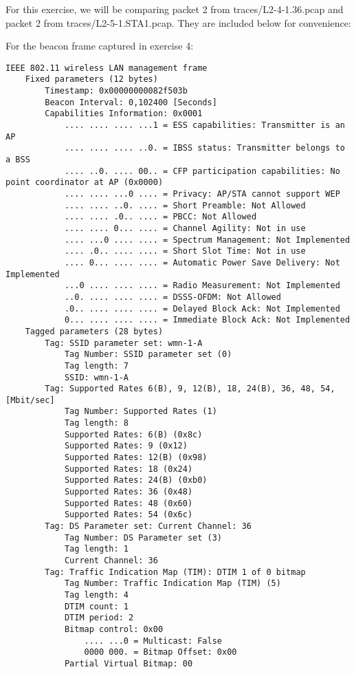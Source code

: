 For this exercise, we will be comparing packet 2 from traces/L2-4-1.36.pcap and packet 2 from traces/L2-5-1.STA1.pcap.
They are included below for convenience:

For the beacon frame captured in  exercise 4:
\begin{lstlisting}
IEEE 802.11 wireless LAN management frame
    Fixed parameters (12 bytes)
        Timestamp: 0x00000000082f503b
        Beacon Interval: 0,102400 [Seconds]
        Capabilities Information: 0x0001
            .... .... .... ...1 = ESS capabilities: Transmitter is an AP
            .... .... .... ..0. = IBSS status: Transmitter belongs to a BSS
            .... ..0. .... 00.. = CFP participation capabilities: No point coordinator at AP (0x0000)
            .... .... ...0 .... = Privacy: AP/STA cannot support WEP
            .... .... ..0. .... = Short Preamble: Not Allowed
            .... .... .0.. .... = PBCC: Not Allowed
            .... .... 0... .... = Channel Agility: Not in use
            .... ...0 .... .... = Spectrum Management: Not Implemented
            .... .0.. .... .... = Short Slot Time: Not in use
            .... 0... .... .... = Automatic Power Save Delivery: Not Implemented
            ...0 .... .... .... = Radio Measurement: Not Implemented
            ..0. .... .... .... = DSSS-OFDM: Not Allowed
            .0.. .... .... .... = Delayed Block Ack: Not Implemented
            0... .... .... .... = Immediate Block Ack: Not Implemented
    Tagged parameters (28 bytes)
        Tag: SSID parameter set: wmn-1-A
            Tag Number: SSID parameter set (0)
            Tag length: 7
            SSID: wmn-1-A
        Tag: Supported Rates 6(B), 9, 12(B), 18, 24(B), 36, 48, 54, [Mbit/sec]
            Tag Number: Supported Rates (1)
            Tag length: 8
            Supported Rates: 6(B) (0x8c)
            Supported Rates: 9 (0x12)
            Supported Rates: 12(B) (0x98)
            Supported Rates: 18 (0x24)
            Supported Rates: 24(B) (0xb0)
            Supported Rates: 36 (0x48)
            Supported Rates: 48 (0x60)
            Supported Rates: 54 (0x6c)
        Tag: DS Parameter set: Current Channel: 36
            Tag Number: DS Parameter set (3)
            Tag length: 1
            Current Channel: 36
        Tag: Traffic Indication Map (TIM): DTIM 1 of 0 bitmap
            Tag Number: Traffic Indication Map (TIM) (5)
            Tag length: 4
            DTIM count: 1
            DTIM period: 2
            Bitmap control: 0x00
                .... ...0 = Multicast: False
                0000 000. = Bitmap Offset: 0x00
            Partial Virtual Bitmap: 00
\end{lstlisting}
